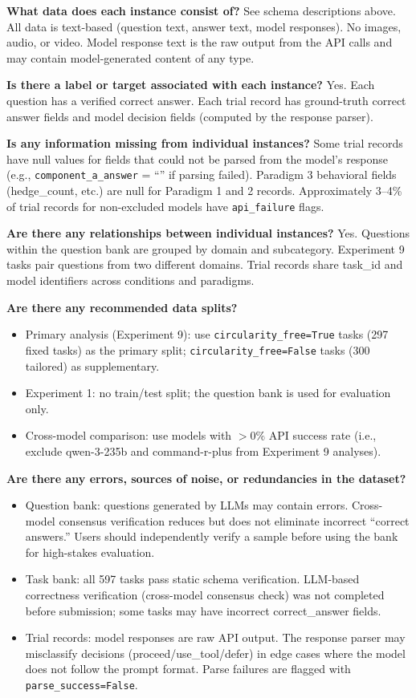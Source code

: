 \textbf{What data does each instance consist of?}
See schema descriptions above. All data is text-based (question text, answer text,
model responses). No images, audio, or video. Model response text is the raw
output from the API calls and may contain model-generated content of any type.

\textbf{Is there a label or target associated with each instance?}
Yes. Each question has a verified correct answer. Each trial record has ground-truth
correct answer fields and model decision fields (computed by the response parser).

\textbf{Is any information missing from individual instances?}
Some trial records have null values for fields that could not be parsed from the
model's response (e.g., \texttt{component\_a\_answer} = ``'' if parsing failed).
Paradigm 3 behavioral fields (hedge\_count, etc.) are null for Paradigm 1 and 2
records. Approximately 3--4\% of trial records for non-excluded models have
\texttt{api\_failure} flags.

\textbf{Are there any relationships between individual instances?}
Yes. Questions within the question bank are grouped by domain and subcategory.
Experiment 9 tasks pair questions from two different domains. Trial records share
task\_id and model identifiers across conditions and paradigms.

\textbf{Are there any recommended data splits?}
\begin{itemize}
  \item Primary analysis (Experiment 9): use \texttt{circularity\_free=True} tasks
    (297 fixed tasks) as the primary split; \texttt{circularity\_free=False} tasks
    (300 tailored) as supplementary.
  \item Experiment 1: no train/test split; the question bank is used for evaluation only.
  \item Cross-model comparison: use models with $>0\%$ API success rate (i.e., exclude
    qwen-3-235b and command-r-plus from Experiment 9 analyses).
\end{itemize}

\textbf{Are there any errors, sources of noise, or redundancies in the dataset?}
\begin{itemize}
  \item Question bank: questions generated by LLMs may contain errors. Cross-model
    consensus verification reduces but does not eliminate incorrect ``correct answers.''
    Users should independently verify a sample before using the bank for high-stakes
    evaluation.
  \item Task bank: all 597 tasks pass static schema verification. LLM-based
    correctness verification (cross-model consensus check) was not completed before
    submission; some tasks may have incorrect correct\_answer fields.
  \item Trial records: model responses are raw API output. The response parser may
    misclassify decisions (proceed/use\_tool/defer) in edge cases where the model
    does not follow the prompt format. Parse failures are flagged with
    \texttt{parse\_success=False}.
\end{itemize}

